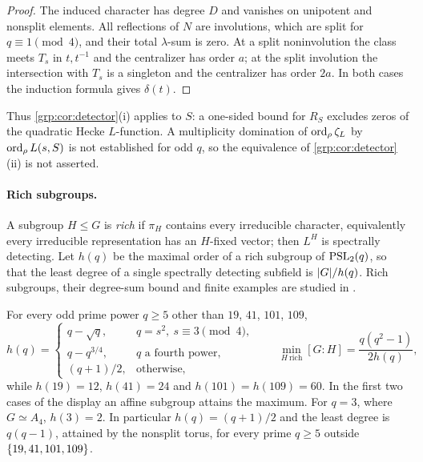 
\begin{proof}
The induced character has degree $D$ and vanishes on unipotent and nonsplit
elements. All reflections of $N$ are involutions, which are split for
$q\equiv1\pmod4$, and their total $\lambda$-sum is zero. At a split
noninvolution the class meets $T_s$ in $t,t^{-1}$ and the centralizer has
order $a$; at the split involution the intersection with $T_s$ is a singleton
and the centralizer has order $2a$. In both cases the induction formula gives
$\delta(t)$.
\end{proof}

Thus \cref{grp:cor:detector}(i) applies to $S$: a one-sided bound for $R_S$
excludes zeros of the quadratic Hecke $L$-function. A multiplicity domination
of $\operatorname{ord}_\rho\zeta_L$ by $\operatorname{ord}_\rho L(s,S)$ is not established for odd $q$,
so the equivalence of \cref{grp:cor:detector}(ii) is not asserted.

\paragraph{Rich subgroups.}
A subgroup $H\le G$ is \emph{rich} if $\pi_H$ contains every irreducible
character, equivalently every irreducible representation has an $H$-fixed
vector; then $L^H$ is spectrally detecting. Let $h(q)$ be the maximal order of
a rich subgroup of $\operatorname{PSL}_2(q)$, so that the least degree of a single
spectrally detecting subfield is $\lvert G\rvert/h(q)$. Rich subgroups, their
degree-sum bound and finite examples are studied in
\cite{BreuerHethelyiHorvathKulshammer2025Frobenius}.

\begin{theorem}
\label{grp:thm:odd-rich}
For every odd prime power $q\ge5$ other than $19$, $41$, $101$, $109$,
\[
 h(q)=
 \begin{cases}
 q-\sqrt q,&q=s^2,\ s\equiv3\pmod4,\\
 q-q^{3/4},&q\text{ a fourth power},\\
 (q+1)/2,&\text{otherwise},
 \end{cases}
 \qquad
 \min_{H\ \mathrm{rich}}[G:H]=\frac{q(q^2-1)}{2h(q)} ,
\]
while $h(19)=12$, $h(41)=24$ and $h(101)=h(109)=60$. In the first two cases of
the display an affine subgroup attains the maximum. For $q=3$, where
$G\simeq A_4$, $h(3)=2$. In particular $h(q)=(q+1)/2$ and the least degree is
$q(q-1)$, attained by the nonsplit torus, for every prime
$q\ge5$ outside $\{19,41,101,109\}$.
\end{theorem}

